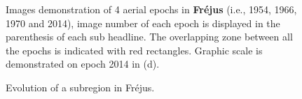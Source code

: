 \begin{figure}[htbp]
\begin{center}
{\begin{minipage}[t]{0.46\linewidth}
    \end{minipage}%
}
        \caption{Images demonstration of 4 aerial epochs in \textbf{Fr{\'e}jus} (i.e., 1954, 1966, 1970 and 2014), image number of each epoch is displayed in the parenthesis of each sub headline. The overlapping zone between all the epochs is indicated with red rectangles. Graphic scale is demonstrated on epoch 2014 in (d).}
        \label{FrejusData}
    \end{center}
\end{figure} 

\begin{figure}[htbp]
	\begin{center}
		\caption{Evolution of a subregion in Fr{\'e}jus.}
		\label{FrejusEvolution}
	\end{center}
\end{figure} 

